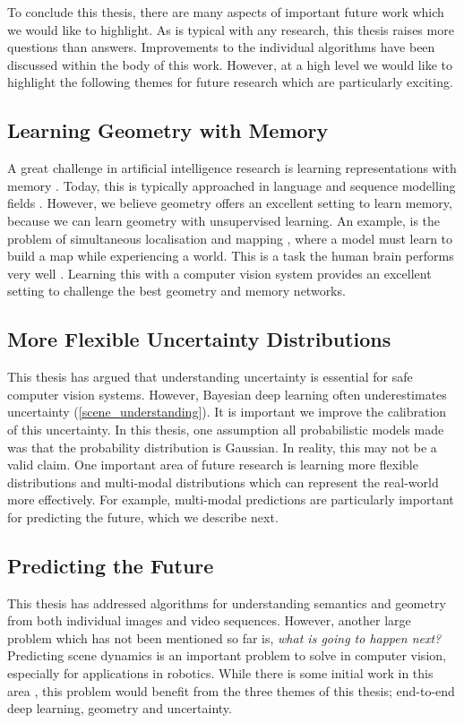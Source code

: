 To conclude this thesis, there are many aspects of important future work which we would like to highlight. As is typical with any research, this thesis raises more questions than answers. Improvements to the individual algorithms have been discussed within the body of this work. However, at a high level we would like to highlight the following themes for future research which are particularly exciting.

\subsection{Learning Geometry with Memory}
A great challenge in artificial intelligence research is learning representations with memory \citep{graves2014neural}. Today, this is typically approached in language and sequence modelling fields \citep{weston2014memory}. However, we believe geometry offers an excellent setting to learn memory, because we can learn geometry with unsupervised learning. An example, is the problem of simultaneous localisation and mapping \citep{durrant2006simultaneous}, where a model must learn to build a map while experiencing a world. This is a task the human brain performs very well \citep{moser2008place,o1978hippocampus}. Learning this with a computer vision system provides an excellent setting to challenge the best geometry and memory networks.

\subsection{More Flexible Uncertainty Distributions}
This thesis has argued that understanding uncertainty is essential for safe computer vision systems. However, Bayesian deep learning often underestimates uncertainty (\cref{scene_understanding}). It is important we improve the calibration of this uncertainty. In this thesis, one assumption all probabilistic models made was that the probability distribution is Gaussian. In reality, this may not be a valid claim. One important area of future research is learning more flexible distributions and multi-modal distributions which can represent the real-world more effectively. For example, multi-modal predictions are particularly important for predicting the future, which we describe next.

\subsection{Predicting the Future}
This thesis has addressed algorithms for understanding semantics and geometry from both individual images and video sequences. However, another large problem which has not been mentioned so far is, \textit{what is going to happen next?} Predicting scene dynamics is an important problem to solve in computer vision, especially for applications in robotics. While there is some initial work in this area \citep{luc2017predicting}, this problem would benefit from the three themes of this thesis; end-to-end deep learning, geometry and uncertainty.

